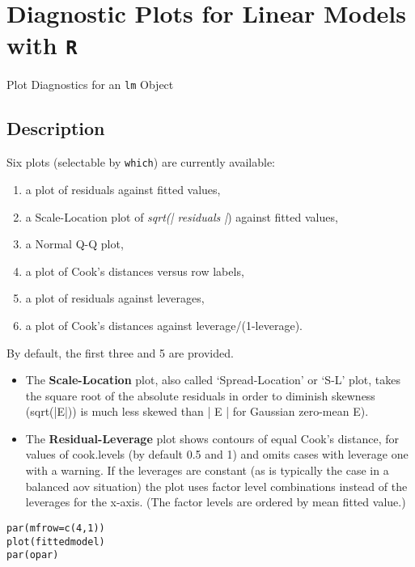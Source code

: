 \documentclass[12pt]{article}
\begin{document}
\newpage
\section{Diagnostic Plots for Linear Models with \texttt{R}}
Plot Diagnostics for an \texttt{lm} Object

\subsection{Description}

Six plots (selectable by \texttt{which}) are currently available: 
\begin{enumerate}
\item a plot of residuals against fitted values, 
\item a Scale-Location plot of \textit{sqrt(| residuals |}) against fitted values, 
\item a Normal Q-Q plot, 
\item a plot of Cook's distances versus row labels, 
\item a plot of residuals against leverages, 
\item a plot of Cook's distances against leverage/(1-leverage).
\end{enumerate} By default, the first three and 5 are provided.

\begin{itemize}
\item
The \textbf{Scale-Location} plot, also called ‘Spread-Location’ or ‘S-L’ plot, takes the square root of the absolute residuals in order to diminish skewness (sqrt(|E|)) is much less skewed than | E | for Gaussian zero-mean E).

\item
The \textbf{Residual-Leverage} plot shows contours of equal Cook's distance, for values of cook.levels (by default 0.5 and 1) and omits cases with leverage one with a warning. If the leverages are constant (as is typically the case in a balanced aov situation) the plot uses factor level combinations instead of the leverages for the x-axis. (The factor levels are ordered by mean fitted value.)
\end{itemize}
\begin{framed}
\begin{verbatim}
par(mfrow=c(4,1))
plot(fittedmodel)
par(opar)
\end{verbatim}
\end{framed}
\newpage
\end{document}
